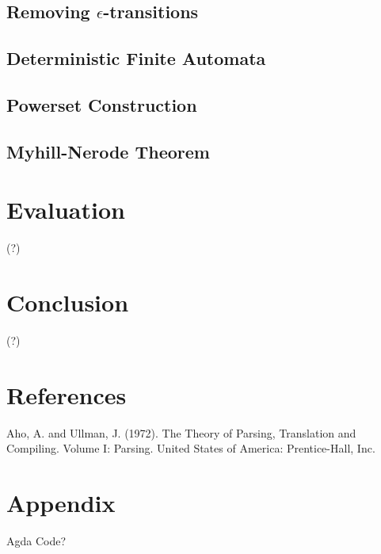 \documentclass[twoside,openright,final]{bhamthesis}
\begin{document}
\subsection{Removing \(\epsilon\)-transitions}

\subsection{Deterministic Finite Automata}

\subsection{Powerset Construction}

\subsection{Myhill-Nerode Theorem}

\section{Evaluation}
(?)

\section{Conclusion}
(?)

\section{References}
Aho, A. and Ullman, J. (1972). The Theory of Parsing, Translation and Compiling. Volume I: Parsing. United States of America: Prentice-Hall, Inc.

\section{Appendix}
Agda Code?
\end{document}
